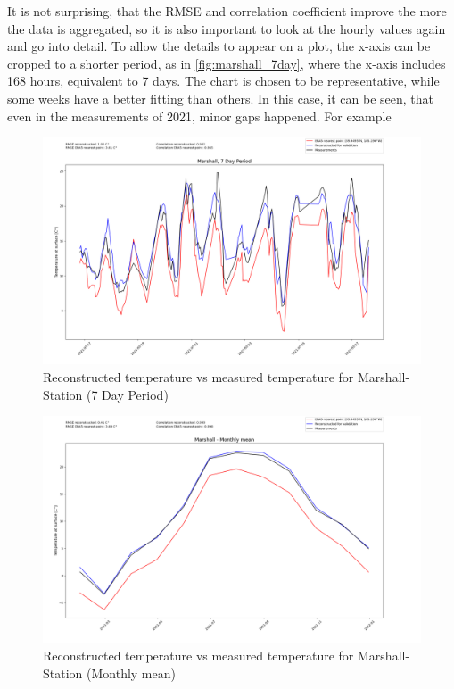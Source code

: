 It is not surprising, that the RMSE and correlation coefficient improve the more the data is aggregated, so it is also important to look at the hourly values again and go into detail. To allow the details to appear on a plot, the x-axis can be cropped to a shorter period, as in \autoref{fig:marshall_7day}, where the x-axis includes 168 hours, equivalent to 7 days. The chart is chosen to be representative, while some weeks have a better fitting than others. In this case, it can be seen, that even in the measurements of 2021, minor gaps happened. For example  


\begin{figure}
    \centering
    \includegraphics[width=1.07\textwidth]{resources/images/charts/marshall_eval_grib_final/Marshall, 7 Day Period_1_2_3.png}
    \caption{Reconstructed temperature vs measured temperature for Marshall-Station (7 Day Period)}
    \label{fig:marshall_7day}
\end{figure}

\begin{figure}
    \centering
    \includegraphics[width=1.07\textwidth]{resources/images/charts/marshall_eval_grib_final/Marshall - Monthly mean.png}
    \caption{Reconstructed temperature vs measured temperature for Marshall-Station (Monthly mean)}
\end{figure}


